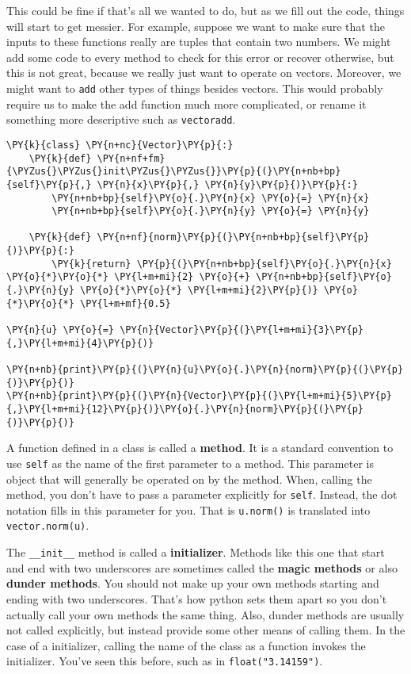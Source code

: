 This could be fine if that's all we wanted to do, but as we fill out the code, things will start to get messier.  For example, suppose we want to make sure that the inputs to these functions really are tuples that contain two numbers.  We might add some code to every method to check for this error or recover otherwise, but this is not great, because we really just want to operate on vectors.  Moreover, we might want to \texttt{add} other types of things besides vectors.  This would probably require us to make the add function much more complicated, or rename it something more descriptive such as \texttt{vectoradd}.

\begin{Verbatim}[commandchars=\\\{\}]
\PY{k}{class} \PY{n+nc}{Vector}\PY{p}{:}
    \PY{k}{def} \PY{n+nf+fm}{\PYZus{}\PYZus{}init\PYZus{}\PYZus{}}\PY{p}{(}\PY{n+nb+bp}{self}\PY{p}{,} \PY{n}{x}\PY{p}{,} \PY{n}{y}\PY{p}{)}\PY{p}{:}
        \PY{n+nb+bp}{self}\PY{o}{.}\PY{n}{x} \PY{o}{=} \PY{n}{x}
        \PY{n+nb+bp}{self}\PY{o}{.}\PY{n}{y} \PY{o}{=} \PY{n}{y}

    \PY{k}{def} \PY{n+nf}{norm}\PY{p}{(}\PY{n+nb+bp}{self}\PY{p}{)}\PY{p}{:}
        \PY{k}{return} \PY{p}{(}\PY{n+nb+bp}{self}\PY{o}{.}\PY{n}{x} \PY{o}{*}\PY{o}{*} \PY{l+m+mi}{2} \PY{o}{+} \PY{n+nb+bp}{self}\PY{o}{.}\PY{n}{y} \PY{o}{*}\PY{o}{*} \PY{l+m+mi}{2}\PY{p}{)} \PY{o}{*}\PY{o}{*} \PY{l+m+mf}{0.5}

\PY{n}{u} \PY{o}{=} \PY{n}{Vector}\PY{p}{(}\PY{l+m+mi}{3}\PY{p}{,}\PY{l+m+mi}{4}\PY{p}{)}

\PY{n+nb}{print}\PY{p}{(}\PY{n}{u}\PY{o}{.}\PY{n}{norm}\PY{p}{(}\PY{p}{)}\PY{p}{)}
\PY{n+nb}{print}\PY{p}{(}\PY{n}{Vector}\PY{p}{(}\PY{l+m+mi}{5}\PY{p}{,}\PY{l+m+mi}{12}\PY{p}{)}\PY{o}{.}\PY{n}{norm}\PY{p}{(}\PY{p}{)}\PY{p}{)}
\end{Verbatim}



A function defined in a class is called a \textbf{method}.  It is a standard convention to use \texttt{self} as the name of the first parameter to a method.  This parameter is object that will generally be operated on by the method.  When, calling the method, you don't have to pass a parameter explicitly for \texttt{self}.  Instead, the dot notation fills in this parameter for you.  That is \texttt{u.norm()} is translated into \texttt{vector.norm(u)}.  


The \texttt{\_\_init\_\_} method is called a \textbf{initializer}.  Methods like this one that start and end with two underscores are sometimes called the \textbf{magic methods} or also \textbf{dunder methods}.  You should not make up your own methods starting and ending with two underscores.  That's how python sets them apart so you don't actually call your own methods the same thing.  Also, dunder methods are usually not called explicitly, but instead provide some other means of calling them.  In the case of a initializer, calling the name of the class as a function invokes the initializer.  You've seen this before, such as in \texttt{float("3.14159")}.


